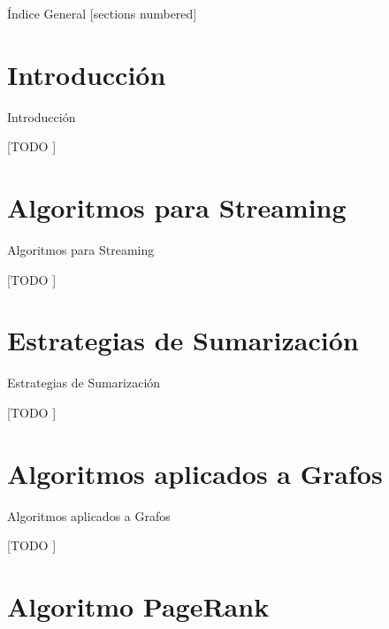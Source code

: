 \documentclass[12pt]{beamer}
\begin{document}
  \maketitle

  \begin{frame}{Índice General}
    [sections numbered]
    \tableofcontents[hideallsubsections]
  \end{frame}

  \section{Introducción}

    \begin{frame}[fragile]{Introducción}

      [TODO ]

    \end{frame}

  \section{Algoritmos para Streaming}

    \begin{frame}[fragile]{Algoritmos para Streaming}

      [TODO ]

    \end{frame}

  \section{Estrategias de Sumarización}

    \begin{frame}[fragile]{Estrategias de Sumarización}

      [TODO ]

    \end{frame}

  \section{Algoritmos aplicados a Grafos}

    \begin{frame}[fragile]{Algoritmos aplicados a Grafos}

      [TODO ]

    \end{frame}

  \section{Algoritmo PageRank}
\end{document}
